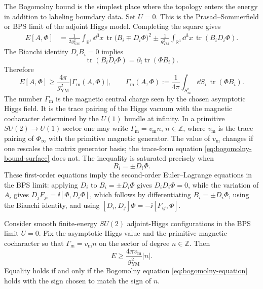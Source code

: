 The Bogomolny bound is the simplest place where the topology enters the
energy in addition to labeling boundary data.  Set \(U=0\).  This is the
Prasad--Sommerfield or BPS limit of the adjoint Higgs model.  Completing the
square gives
\begin{align}
  E[A,\Phi]
  &=
  \frac1{2g_{\mathrm{YM}}^2}
  \int_{\mathbb R^3}\dd^3x\,
  \operatorname{tr}\bigl(B_i\mp D_i\Phi\bigr)^2
  \pm
  \frac1{g_{\mathrm{YM}}^2}
  \int_{\mathbb R^3}\dd^3x\,
  \operatorname{tr}(B_iD_i\Phi).
  \label{eq:bogomolny-square}
\end{align}
The Bianchi identity \(D_iB_i=0\) implies
\[
  \operatorname{tr}(B_iD_i\Phi)
  =
  \partial_i\operatorname{tr}(\Phi B_i).
\]
Therefore
\begin{equation}
  E[A,\Phi]
  \ge
  \frac{4\pi}{g_{\mathrm{YM}}^2}
  |\Gamma_{\mathrm m}(A,\Phi)|,
  \qquad
  \Gamma_{\mathrm m}(A,\Phi)
  :=
  \frac1{4\pi}
  \int_{S^2_\infty}\dd S_i\,\operatorname{tr}(\Phi B_i).
  \label{eq:bogomolny-bound-surface}
\end{equation}
The number \(\Gamma_{\mathrm m}\) is the magnetic central charge seen by the
chosen asymptotic Higgs field.  It is the trace pairing of the Higgs vacuum
with the magnetic cocharacter determined by the \(U(1)\) bundle at infinity.
In a primitive \(SU(2)\to U(1)\) sector one may write
\(\Gamma_{\mathrm m}=v_{\mathrm m}n\), \(n\in\mathbb Z\), where
\(v_{\mathrm m}\) is the trace pairing of \(\Phi_\infty\) with the primitive
magnetic generator.  The value of \(v_{\mathrm m}\) changes if one rescales
the matrix generator basis; the trace-form equation
\eqref{eq:bogomolny-bound-surface} does not.
The inequality is saturated precisely when
\begin{equation}
  B_i=\pm D_i\Phi.
  \label{eq:bogomolny-equation}
\end{equation}
These first-order equations imply the second-order Euler--Lagrange equations
in the BPS limit: applying \(D_i\) to \(B_i=\pm D_i\Phi\) gives
\(D_iD_i\Phi=0\), while the variation of \(A_i\) gives
\(D_jF_{ji}=\ii[\Phi,D_i\Phi]\), which follows by differentiating
\(B_i=\pm D_i\Phi\), using the Bianchi identity, and using
\([D_i,D_j]\Phi=-\ii[F_{ij},\Phi]\).

\begin{proposition}
\label{prop:su2-bogomolny-bound}
Consider smooth finite-energy \(SU(2)\) adjoint-Higgs configurations in the
BPS limit \(U=0\).  Fix the asymptotic Higgs value and the primitive magnetic
cocharacter so that \(\Gamma_{\mathrm m}=v_{\mathrm m}n\) on the sector of
degree \(n\in\mathbb Z\).  Then
\[
  E\ge \frac{4\pi v_{\mathrm m}}{g_{\mathrm{YM}}^2}|n|.
\]
Equality holds if and only if the Bogomolny equation
\eqref{eq:bogomolny-equation} holds with the sign chosen to match the sign of
\(n\).
\end{proposition}


